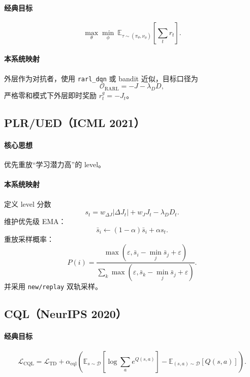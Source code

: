 \documentclass[UTF8,11pt,a4paper]{ctexart}
\begin{document}
\paragraph{经典目标}
\begin{equation}
\max_{\theta}\min_{\phi}\ \mathbb{E}_{\tau\sim (\pi_\theta,\nu_\phi)}\!\left[\sum_t r_t\right].
\end{equation}
\paragraph{本系统映射}
外层作为对抗者，使用 \texttt{rarl\_dqn} 或 bandit 近似，目标口径为
\begin{equation}
\mathcal{O}_{\text{RARL}}=-J-\lambda_DD,
\end{equation}
严格零和模式下外层即时奖励 \(r_t^g=-J_t\)。

\subsection{PLR/UED（ICML 2021）}
\paragraph{核心思想}
优先重放“学习潜力高”的 level。
\paragraph{本系统映射}
定义 level 分数
\begin{equation}
s_t=w_{\Delta J}|\Delta J_t|+w_JJ_t-\lambda_DD_t.
\end{equation}
维护优先级 EMA：
\begin{equation}
\bar s_i\leftarrow (1-\alpha)\bar s_i+\alpha s_t.
\end{equation}
重放采样概率：
\begin{equation}
P(i)=\frac{\max(\varepsilon,\bar s_i-\min_j \bar s_j+\varepsilon)}{\sum_k \max(\varepsilon,\bar s_k-\min_j \bar s_j+\varepsilon)}.
\end{equation}
并采用 \texttt{new/replay} 双轨采样。

\subsection{CQL（NeurIPS 2020）}
\paragraph{经典目标}
\begin{equation}
\mathcal{L}_{\text{CQL}}
=
\mathcal{L}_{\text{TD}}
+\alpha_{\text{cql}}
\left(
\mathbb{E}_{s\sim\mathcal{D}}\left[\log\sum_a e^{Q(s,a)}\right]
-\mathbb{E}_{(s,a)\sim\mathcal{D}}[Q(s,a)]
\right).
\end{equation}
\end{document}
